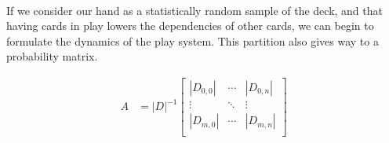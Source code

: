 \documentclass{article}
\theoremstyle{definition}
\begin{document}
\paragraph{}
If we consider our hand as a statistically random sample of the deck, and that having cards in play lowers the dependencies of other cards, we can begin to formulate the dynamics of the play system. This partition also gives way to a probability matrix.

\begin{align*}
A &= |D|^{-1}
\begin{bmatrix}
|D_{0,0}| & \cdots & |D_{0,n}| \\
\vdots & \ddots & \vdots \\
|D_{m,0}| & \cdots & |D_{m,n}| \\
\end{bmatrix}\\
\end{align*}
\end{document}
